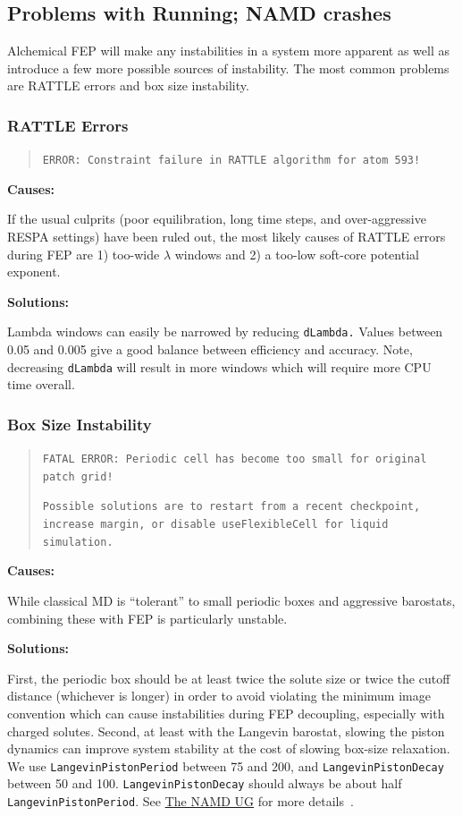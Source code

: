 \documentclass[9pt,tutorial]{Styling/livecoms}
\newcommand{\textInput}[1]{\texttt{#1}}
\begin{document}
\subsection{Problems with Running; NAMD crashes}
Alchemical FEP will make any instabilities in a system more apparent as well as introduce a few more possible sources of instability. The most common problems are RATTLE errors and box size instability.

\subsubsection{RATTLE Errors}
\begin{quote}
\texttt{ERROR: Constraint failure in RATTLE algorithm for atom 593!}
\end{quote}

\noindent\textbf{Causes:}

If the usual culprits (poor equilibration, long time steps, and over-aggressive RESPA settings) have been ruled out, the most likely causes of RATTLE errors during FEP are 1) too-wide $\lambda$ windows and 2) a too-low soft-core potential exponent.

\noindent\textbf{Solutions:}

Lambda windows can easily be narrowed by reducing \textInput{dLambda.} Values between 0.05 and 0.005 give a good balance between efficiency and accuracy.
Note, decreasing \textInput{dLambda} will result in more windows which will require more CPU time overall.

\subsubsection{Box Size Instability}
\begin{quote}
\texttt{FATAL ERROR: Periodic cell has become too small for original patch grid!}

\texttt{Possible solutions are to restart from a recent checkpoint,
increase margin, or disable useFlexibleCell for liquid simulation.}
\end{quote}

\noindent\textbf{Causes:}

While classical MD is ``tolerant'' to small periodic boxes and aggressive barostats, combining these with FEP is particularly unstable.

\noindent\textbf{Solutions:}

First, the periodic box should be at least twice the solute size or twice the cutoff distance (whichever is longer) in order to avoid violating the minimum image convention which can cause instabilities during FEP decoupling, especially with charged solutes. Second, at least with the Langevin barostat, slowing the piston dynamics can improve system stability at the cost of slowing box-size relaxation. We use \textInput{LangevinPistonPeriod} between 75 and 200, and \textInput{LangevinPistonDecay} between 50 and 100. \textInput{LangevinPistonDecay} should always be about half \textInput{LangevinPistonPeriod}. See \href{https://www.ks.uiuc.edu/Research/namd/2.14/ug/node39.html}{The NAMD UG} for more details~\cite{Bernardi2020}.
\end{document}
